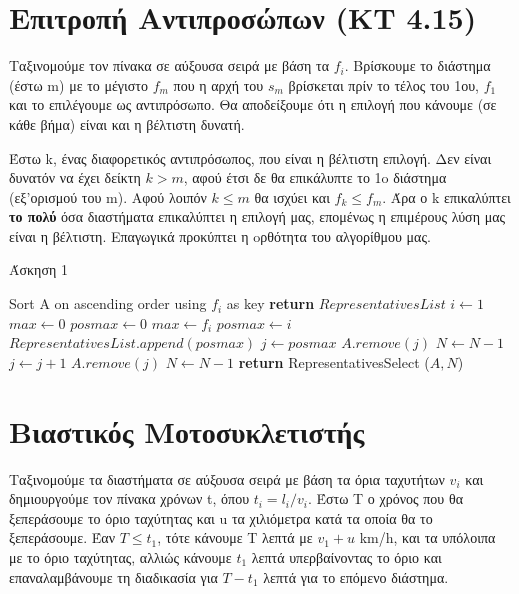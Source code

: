 \documentclass[a4paper,11pt]{article}
\begin{document}
\renewcommand{\labelenumi}{\roman{enumi})}
\renewcommand{\labelenumii}{(\arabic{enumii})}



\section{Επιτροπή Αντιπροσώπων (KT 4.15)} \setcounter{section}{1}
Ταξινομούμε τον πίνακα σε αύξουσα σειρά με βάση τα $f_i$. Βρίσκουμε το διάστημα (έστω m) με το
μέγιστο $f_m$ που η αρχή του $s_m$ βρίσκεται πρίν το τέλος του 1ου, $f_1$ και
το επιλέγουμε ως αντιπρόσωπο.
Θα αποδείξουμε ότι η επιλογή που κάνουμε (σε κάθε βήμα) είναι και η βέλτιστη
δυνατή.

Έστω k, ένας διαφορετικός αντιπρόσωπος, που είναι η βέλτιστη επιλογή. Δεν
είναι δυνατόν να έχει δείκτη $k > m$, αφού έτσι δε θα επικάλυπτε το 1o διάστημα
(εξ'ορισμού του m). Αφού λοιπόν $k \leq m$ θα ισχύει και $f_k \leq f_m$. Άρα ο
k επικαλύπτει \textbf{το πολύ} όσα διαστήματα επικαλύπτει η επιλογή μας,
επομένως η επιμέρους λύση μας είναι η βέλτιστη.
Eπαγωγικά προκύπτει η oρθότητα του αλγορίθμου μας.

\begin{algorithm}[H]
\caption{Άσκηση 1}
\begin{algorithmic}[1]
    \State Sort A on ascending order using $f_i$ as key
    \State \textbf{return} $RepresentativesList$
    \Else
    \State $i \gets 1$
    \State $max \gets 0$
    \State $posmax \gets 0$
	    \State $max \gets f_i$
	    \State $posmax \gets i$
	\EndIf
    \EndWhile
    \State $RepresentativesList.append (posmax)$
    \State $j \gets posmax$
	\State $A.remove(j)$
	\State $N \gets N-1$
	\State $j \gets j+1$
    \EndWhile
	\State $A.remove (j)$
	\State $N \gets N-1$
    \EndFor
    \State \textbf{return} RepresentativesSelect ($A, N$)
    \EndIf
\EndProcedure
\end{algorithmic}
\end{algorithm}


\section{Βιαστικός Μοτοσυκλετιστής}
Ταξινομούμε τα διαστήματα σε αύξουσα σειρά με βάση τα όρια ταχυτήτων $v_i$ και
δημιουργούμε τον πίνακα χρόνων t, όπου $t_i = l_i/v_i$.
Έστω Τ ο χρόνος που θα ξεπεράσουμε το όριο ταχύτητας και u τα χιλιόμετρα κατά
τα οποία θα το ξεπεράσουμε. Έαν $T \leq t_1$, τότε κάνουμε Τ λεπτά με $v_1 +
u$ km/h, και τα υπόλοιπα με το όριο ταχύτητας, αλλιώς κάνουμε $t_1$ λεπτά
υπερβαίνοντας το όριο και επαναλαμβάνουμε τη διαδικασία για $T - t_1$ λεπτά
για το επόμενο διάστημα.
\end{document}
